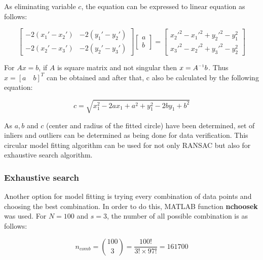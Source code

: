 \documentclass[paper=a4, fontsize=11pt]{scrartcl} %
\numberwithin{equation}{section} %
\numberwithin{figure}{section} %
\numberwithin{table}{section} %
\newcommand{\funcname}[1]{\textbf{#1}}
\newcommand{\inv}{^{\raisebox{.2ex}{$\scriptscriptstyle-1$}}}
\begin{document}
As eliminating variable $c$, the equation can be expressed to linear equation as follows:


\begin{equation*}
\begin{bmatrix}
    -2(x_{1}' - x_{2}')       &     -2(y_{1}' - y_{2}') \\
    -2(x_{2}' - x_{3}')       &     -2(y_{2}' - y_{3}') 
\end{bmatrix}
\begin{bmatrix}
    a \\
    b
\end{bmatrix}
=
\begin{bmatrix}
    x_{2}'^{2} - x_{1}'^{2} +  y_{2}'^{2} - y_{1}^{2} \\
    x_{3}'^{2} - x_{2}'^{2} +  y_{3}'^{2} - y_{2}^{2}
\end{bmatrix}
\end{equation*}

For $Ax = b$, if $A$ is square matrix and not singular then $x = A \inv b$. Thus $x = [a \quad b]^{T}$ can be obtained and after that, c also be calculated by the following equation: 

\begin{equation*}
c = \sqrt{x_{1}^{2} - 2 a x_{1} +  a^{2} + y_{1}^{2} - 2 b y_{1} + b^{2}}
\end{equation*}

As $a, b$ and $c$ (center and radius of the fitted circle) have been determined, set of inliers and outliers can be determined as being done for data verification. This circular model fitting algorithm can be used for not only RANSAC but also for exhaustive search algorithm.

\subsubsection{Exhaustive search}

Another option for model fitting is trying every combination of data points and choosing the best combination. In order to do this, MATLAB function \funcname{nchoosek} was used. For $N = 100$ and $s = 3$, the number of all possible combination is as follows:

\begin{equation*}
n_{comb} = \binom{100}{3}=\frac{100!}{3! \times 97!}=161700
\end{equation*}
\end{document}
